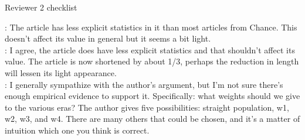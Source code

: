 \documentclass[11pt]{article}
\begin{document}
\footnotesize

\color{black}
\normalsize 

\bigskip

\begin{center}
{\LARGE Reviewer 2 checklist}
\end{center}


:
The article has less explicit statistics in it than most articles from 
Chance.  This doesn't affect its value in general but it seems a bit light. \\

: 
I agree, the article does have less explicit statistics and that shouldn't 
affect its value.  %
The article is now shortened by about 1/3, perhaps the reduction in length 
will lessen its light appearance. \\



:
I generally sympathize with the author's argument, but I'm not sure there's 
enough empirical evidence to support it.  Specifically: what weights should we 
give to the various eras?  The author gives five possibilities: straight 
population, w1, w2, w3, and w4.  There are many others that could 
be chosen, and it's a matter of intuition which one you think is correct. 
\end{document}
